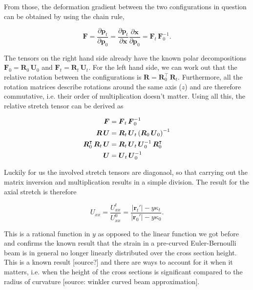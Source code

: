 From those, the deformation gradient between the two configurations in question can be obtained by using the chain rule,

\begin{equation}
\boldsymbol{F} = \frac{\partial \boldsymbol{p}_{t}}{\partial \boldsymbol{p}_{0}} = \frac{\partial \boldsymbol{p}_{t}}{\partial \boldsymbol{x}}\frac{\partial \boldsymbol{x}}{\partial \boldsymbol{p}_{0}} = \boldsymbol{F}_{t}\,\boldsymbol{F}_{0}^{-1}.
\end{equation}

The tensors on the right hand side already have the known polar decompositions $\boldsymbol{F}_{0} = \boldsymbol{R}_{0}\,\boldsymbol{U}_{0}$ and $\boldsymbol{F}_{t} = \boldsymbol{R}_{t}\,\boldsymbol{U}_{t}$.
For the left hand side, we can work out that the relative rotation between the configurations is $\boldsymbol{R} = \boldsymbol{R}_{0}^\intercal\,\boldsymbol{R}_{t}$.
Furthermore, all the rotation matrices describe rotations around the same axis ($z$) and are therefore commutative, i.e. their order of multiplication doesn't matter.
Using all this, the relative stretch tensor can be derived as

\begin{align}
\boldsymbol{F} &= \boldsymbol{F}_{t}\,\boldsymbol{F}_{0}^{-1} \notag \\
\boldsymbol{R}\,\boldsymbol{U} &= \boldsymbol{R}_{t}\,\boldsymbol{U}_{t}\left(\boldsymbol{R}_{0}\,\boldsymbol{U}_{0}\right)^{-1} \notag \\
\boldsymbol{R}_{0}^\intercal\,\boldsymbol{R}_{t}\,\boldsymbol{U} &= \boldsymbol{R}_{t}\,\boldsymbol{U}_{t}\,\boldsymbol{U}_{0}^{-1}\,\boldsymbol{R}_{0}^\intercal \notag \\
\boldsymbol{U} &= \boldsymbol{U}_{t}\,\boldsymbol{U}_{0}^{-1}
\end{align}

Luckily for us the involved stretch tensors are diagonaol, so that carrying out the matrix inversion and multiplication results in a simple division.
The result for the axial stretch is therefore

\begin{equation}
U_{xx} = \frac{U_{xx}^{t}}{U_{xx}^{0}} = \frac{|\boldsymbol{r}_{t}'| - y\kappa_{t}}{|\boldsymbol{r}_{0}'| - y\kappa_{0}}. \label{eq:strain-nonlinear}
\end{equation}

This is a rational function in $y$ as opposed to the linear function we got before and confirms the known result that the strain in a pre-curved Euler-Bernoulli beam is in general no longer linearly distributed over the cross section height.
This is a known result [source?] and there are ways to account for it when it matters, i.e. when the height of the cross sections is significant compared to the radius of curvature [source: winkler curved beam approximation].


